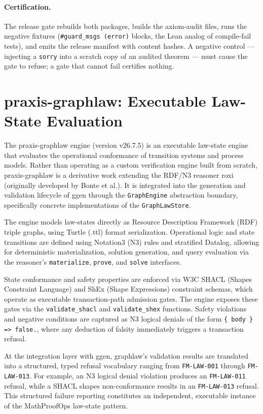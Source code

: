 \documentclass[11pt]{article}
\begin{document}
\paragraph{Certification.}
The release gate rebuilds both packages, builds the axiom-audit files,
runs the negative fixtures (\texttt{\#guard\_msgs (error)} blocks, the Lean
analog of compile-fail tests), and emits the release manifest with content
hashes. A negative control --- injecting a \texttt{sorry} into a scratch
copy of an audited theorem --- must cause the gate to refuse; a gate that
cannot fail certifies nothing.

\section{praxis-graphlaw: Executable Law-State Evaluation}
\label{sec:praxis-graphlaw}

The \textsf{praxis-graphlaw} engine (version v26.7.5) is an executable law-state engine that evaluates the operational conformance of transition systems and process models. Rather than operating as a custom verification engine built from scratch, \textsf{praxis-graphlaw} is a derivative work extending the RDF/N3 reasoner \textsf{roxi} (originally developed by Bonte et al.). It is integrated into the generation and validation lifecycle of \textsf{ggen} through the \texttt{GraphEngine} abstraction boundary, specifically concrete implementations of the \texttt{GraphLawStore}.

The engine models law-states directly as Resource Description Framework (RDF) triple graphs, using Turtle (.ttl) format serialization. Operational logic and state transitions are defined using Notation3 (N3) rules and stratified Datalog, allowing for deterministic materialization, solution generation, and query evaluation via the reasoner's \texttt{materialize}, \texttt{prove}, and \texttt{solve} interfaces.

State conformance and safety properties are enforced via W3C SHACL (Shapes Constraint Language) and ShEx (Shape Expressions) constraint schemas, which operate as executable transaction-path admission gates. The engine exposes these gates via the \texttt{validate\_shacl} and \texttt{validate\_shex} functions. Safety violations and negative conditions are captured as N3 logical denials of the form \texttt{\{ body \} => false.}, where any deduction of falsity immediately triggers a transaction refusal.

At the integration layer with \textsf{ggen}, graphlaw's validation results are translated into a structured, typed refusal vocabulary ranging from \texttt{FM-LAW-001} through \texttt{FM-LAW-013}. For example, an N3 logical denial violation produces an \texttt{FM-LAW-011} refusal, while a SHACL shapes non-conformance results in an \texttt{FM-LAW-013} refusal. This structured failure reporting constitutes an independent, executable instance of the MathProofOps law-state pattern.
\end{document}
